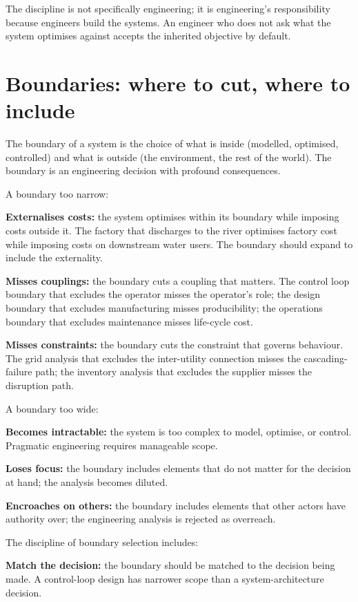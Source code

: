 The discipline is not specifically engineering; it is engineering's responsibility because engineers build the systems. An engineer who does not ask what the system optimises against accepts the inherited objective by default.

\section{Boundaries: where to cut, where to include}

The boundary of a system is the choice of what is inside (modelled, optimised, controlled) and what is outside (the environment, the rest of the world). The boundary is an engineering decision with profound consequences.

A boundary too narrow:

\textbf{Externalises costs:} the system optimises within its boundary while imposing costs outside it. The factory that discharges to the river optimises factory cost while imposing costs on downstream water users. The boundary should expand to include the externality.

\textbf{Misses couplings:} the boundary cuts a coupling that matters. The control loop boundary that excludes the operator misses the operator's role; the design boundary that excludes manufacturing misses producibility; the operations boundary that excludes maintenance misses life-cycle cost.

\textbf{Misses constraints:} the boundary cuts the constraint that governs behaviour. The grid analysis that excludes the inter-utility connection misses the cascading-failure path; the inventory analysis that excludes the supplier misses the disruption path.

A boundary too wide:

\textbf{Becomes intractable:} the system is too complex to model, optimise, or control. Pragmatic engineering requires manageable scope.

\textbf{Loses focus:} the boundary includes elements that do not matter for the decision at hand; the analysis becomes diluted.

\textbf{Encroaches on others:} the boundary includes elements that other actors have authority over; the engineering analysis is rejected as overreach.

The discipline of boundary selection includes:

\textbf{Match the decision:} the boundary should be matched to the decision being made. A control-loop design has narrower scope than a system-architecture decision.

